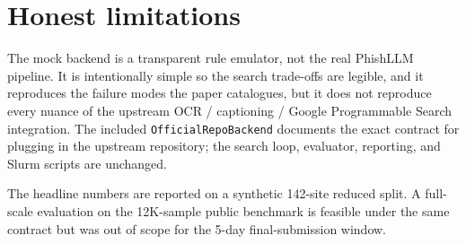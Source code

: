 \documentclass[10pt,conference]{IEEEtran}
\begin{document}
\section{Honest limitations}
The mock backend is a transparent rule emulator, not the real PhishLLM
pipeline. It is intentionally simple so the search trade-offs are
legible, and it reproduces the failure modes the paper catalogues, but it
does not reproduce every nuance of the upstream OCR / captioning / Google
Programmable Search integration. The included \texttt{OfficialRepoBackend}
documents the exact contract for plugging in the upstream repository; the
search loop, evaluator, reporting, and Slurm scripts are unchanged.

The headline numbers are reported on a synthetic 142-site reduced split.
A full-scale evaluation on the 12K-sample public benchmark is feasible
under the same contract but was out of scope for the 5-day final-submission
window.
\end{document}
